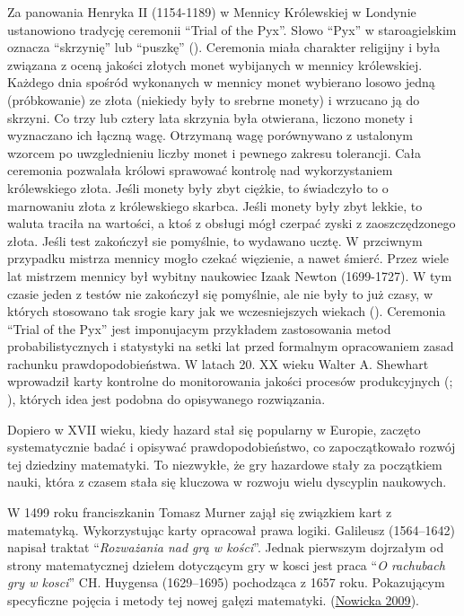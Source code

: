 \documentclass[
  letterpaper,
  DIV=11,
  numbers=noendperiod]{scrreprt}
\begin{document}
Za panowania Henryka II (1154-1189) w Mennicy Królewskiej w Londynie
ustanowiono tradycję ceremonii ``Trial of the Pyx''. Słowo ``Pyx'' w
staroagielskim oznacza ``skrzynię'' lub ``puszkę''
(). Ceremonia miała
charakter religijny i była związana z oceną jakości złotych monet
wybijanych w mennicy królewskiej. Każdego dnia spośród wykonanych w
mennicy monet wybierano losowo jedną (próbkowanie) ze złota (niekiedy
były to srebrne monety) i wrzucano ją do skrzyni. Co trzy lub cztery
lata skrzynia była otwierana, liczono monety i wyznaczano ich łączną
wagę. Otrzymaną wagę porównywano z ustalonym wzorcem po uwzglednieniu
liczby monet i pewnego zakresu tolerancji. Cała ceremonia pozwalała
królowi sprawować kontrolę nad wykorzystaniem królewskiego złota. Jeśli
monety były zbyt ciężkie, to świadczyło to o marnowaniu złota z
królewskiego skarbca. Jeśli monety były zbyt lekkie, to waluta traciła
na wartości, a ktoś z obsługi mógł czerpać zyski z zaoszczędzonego
złota. Jeśli test zakończył sie pomyślnie, to wydawano ucztę. W
przciwnym przypadku mistrza mennicy mogło czekać więzienie, a nawet
śmierć. Przez wiele lat mistrzem mennicy był wybitny naukowiec Izaak
Newton (1699-1727). W tym czasie jeden z testów nie zakończył się
pomyślnie, ale nie były to już czasy, w których stosowano tak srogie
kary jak we wczesniejszych wiekach (). Ceremonia ``Trial of the Pyx'' jest imponujacym
przykładem zastosowania metod probabilistycznych i statystyki na setki
lat przed formalnym opracowaniem zasad rachunku prawdopodobieństwa. W
latach 20. XX wieku Walter A. Shewhart wprowadził karty kontrolne do
monitorowania jakości procesów produkcyjnych
(;
), których idea jest podobna do
opisywanego rozwiązania.

Dopiero w XVII wieku, kiedy hazard stał się popularny w Europie, zaczęto
systematycznie badać i opisywać prawdopodobieństwo, co zapoczątkowało
rozwój tej dziedziny matematyki. To niezwykłe, że gry hazardowe stały za
początkiem nauki, która z czasem stała się kluczowa w rozwoju wielu
dyscyplin naukowych.

W 1499 roku franciszkanin Tomasz Murner zajął się związkiem kart z
matematyką. Wykorzystując karty opracował prawa logiki. Galileusz
(1564--1642) napisał traktat ``\emph{Rozważania nad grą w kości}''.
Jednak pierwszym dojrzałym od strony matematycznej dziełem dotyczącym
gry w kosci jest praca ``\emph{O rachubach gry w kosci}'' CH. Huygensa
(1629--1695) pochodząca z 1657 roku. Pokazującym specyficzne pojęcia i
metody tej nowej gałęzi matematyki.
(\href{https://pg.edu.pl/files/cnm/2021-03/2009_10_KN.pdf}{Nowicka
2009}).
\end{document}
